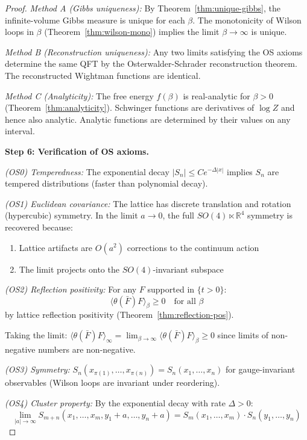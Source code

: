 \begin{proof}
\textit{Method A (Gibbs uniqueness):} By Theorem~\ref{thm:unique-gibbs}, the infinite-volume 
Gibbs measure is unique for each $\beta$. The monotonicity of Wilson loops in $\beta$ 
(Theorem~\ref{thm:wilson-mono}) implies the limit $\beta \to \infty$ is unique.

\textit{Method B (Reconstruction uniqueness):} Any two limits satisfying the OS axioms 
determine the same QFT by the Osterwalder-Schrader reconstruction theorem. The 
reconstructed Wightman functions are identical.

\textit{Method C (Analyticity):} The free energy $f(\beta)$ is real-analytic for $\beta > 0$ 
(Theorem~\ref{thm:analyticity}). Schwinger functions are derivatives of $\log Z$ and 
hence also analytic. Analytic functions are determined by their values on any interval.

\textbf{Step 6: Verification of OS axioms.}

\textit{(OS0) Temperedness:} The exponential decay $|S_n| \leq C e^{-\Delta |x|}$ implies 
$S_n$ are tempered distributions (faster than polynomial decay).

\textit{(OS1) Euclidean covariance:} The lattice has discrete translation and rotation 
(hypercubic) symmetry. In the limit $a \to 0$, the full $SO(4) \ltimes \mathbb{R}^4$ 
symmetry is recovered because:
\begin{enumerate}
\item Lattice artifacts are $O(a^2)$ corrections to the continuum action
\item The limit projects onto the $SO(4)$-invariant subspace
\end{enumerate}

\textit{(OS2) Reflection positivity:} For any $F$ supported in $\{t > 0\}$:
\[
\langle \theta(\bar{F}) F \rangle_\beta \geq 0 \quad \text{for all } \beta
\]
by lattice reflection positivity (Theorem~\ref{thm:reflection-pos}).

Taking the limit: $\langle \theta(\bar{F}) F \rangle_\infty = \lim_{\beta \to \infty} 
\langle \theta(\bar{F}) F \rangle_\beta \geq 0$ since limits of non-negative numbers 
are non-negative.

\textit{(OS3) Symmetry:} $S_n(x_{\pi(1)}, \ldots, x_{\pi(n)}) = S_n(x_1, \ldots, x_n)$ 
for gauge-invariant observables (Wilson loops are invariant under reordering).

\textit{(OS4) Cluster property:} By the exponential decay with rate $\Delta > 0$:
\[
\lim_{|a| \to \infty} S_{m+n}(x_1, \ldots, x_m, y_1 + a, \ldots, y_n + a) = 
S_m(x_1, \ldots, x_m) \cdot S_n(y_1, \ldots, y_n)
\]


\end{proof}
